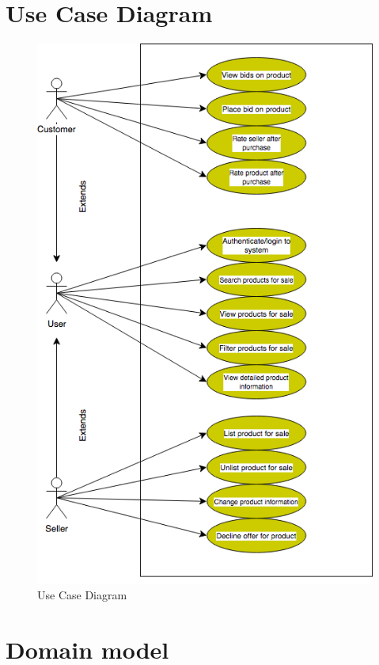 
\section{Use Case Diagram}

\begin{figure}[H]
  \caption{Use Case Diagram}
  \centering
    \includegraphics[scale=0.7]{figures/Use-Case}
\end{figure}

\section{Domain model}

